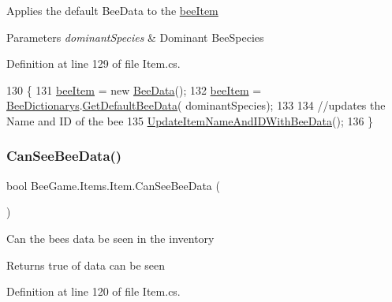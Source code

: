 Applies the default Bee\+Data to the \hyperlink{struct_bee_game_1_1_items_1_1_item_a0593f3b7b3ff5daa864f3c6d0ccd77ca}{bee\+Item} 


\begin{DoxyParams}{Parameters}
{\em dominant\+Species} & Dominant Bee\+Species\\
\hline
\end{DoxyParams}


Definition at line 129 of file Item.\+cs.


\begin{DoxyCode}
130         \{
131             \hyperlink{struct_bee_game_1_1_items_1_1_item_a0593f3b7b3ff5daa864f3c6d0ccd77ca}{beeItem} = \textcolor{keyword}{new} \hyperlink{struct_bee_game_1_1_bee_1_1_bee_data}{BeeData}();
132             \hyperlink{struct_bee_game_1_1_items_1_1_item_a0593f3b7b3ff5daa864f3c6d0ccd77ca}{beeItem} = \hyperlink{class_bee_game_1_1_core_1_1_bee_dictionarys}{BeeDictionarys}.\hyperlink{class_bee_game_1_1_core_1_1_bee_dictionarys_acc616a791a2b14382dbff21433551596}{GetDefaultBeeData}(
      dominantSpecies);
133             
134             \textcolor{comment}{//updates the Name and ID of the bee}
135             \hyperlink{struct_bee_game_1_1_items_1_1_item_a6ceebb94663dc0cb54e048ec37fab3fa}{UpdateItemNameAndIDWithBeeData}();
136         \}
\end{DoxyCode}
\mbox{\label{struct_bee_game_1_1_items_1_1_item_a59ee527a4e9cd5b3e0ed2ec30f248a28}} 
\subsubsection{\texorpdfstring{Can\+See\+Bee\+Data()}{CanSeeBeeData()}}
{\footnotesize\ttfamily bool Bee\+Game.\+Items.\+Item.\+Can\+See\+Bee\+Data (\begin{DoxyParamCaption}{ }\end{DoxyParamCaption})}



Can the bees data be seen in the inventory 

\begin{DoxyReturn}{Returns}
true of data can be seen
\end{DoxyReturn}


Definition at line 120 of file Item.\+cs.


